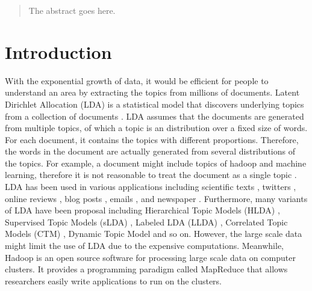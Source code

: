 \documentclass[conference]{IEEEtran}
\begin{document}
\begin{abstract}
The abstract goes here.
\end{abstract}





%
\IEEEpeerreviewmaketitle



\section{Introduction}
With the exponential growth of data, it would be efficient for people to understand an area by extracting the topics from millions of documents. Latent Dirichlet Allocation (LDA) is a statistical model that discovers underlying topics from a collection of documents \cite{blei2003latent}. LDA assumes that the documents are generated from multiple topics, of which a topic is an distribution over a fixed size of words. For each document, it contains the topics with different proportions. Therefore, the words in the document are actually generated from several distributions of the topics. For example, a document might include topics of hadoop and machine learning, therefore it is not reasonable to treat the document as a single topic \cite{srivastava2010text}. LDA has been used in various applications including scientific texts \cite{blei2003latent,griffiths2004finding}, twitters \cite{zhao2011comparing,hong2010empirical}, online reviews \cite{titov2008modeling}, blog posts \cite{yano2009predicting}, emails \cite{mccallum2005topic}, and newspaper \cite{wei2006lda}. Furthermore, many variants of LDA have been proposal including Hierarchical Topic Models (HLDA) \cite{griffiths2004hierarchical,blei2010nested}, Supervised Topic Models (sLDA) \cite{blei2010supervised}, Labeled LDA (LLDA) \cite{ramage2009labeled}, Correlated Topic Models (CTM) \cite{lafferty2005correlated,blei2007correlated}, Dynamic Topic Model \cite{blei2006dynamic} and so on. However, the large scale data might limit the use of LDA due to the expensive computations. Meanwhile, Hadoop is an open source software for processing large scale data on computer clusters. It provides a programming paradigm called MapReduce that allows researchers easily write applications to run on the clusters.
\end{document}
